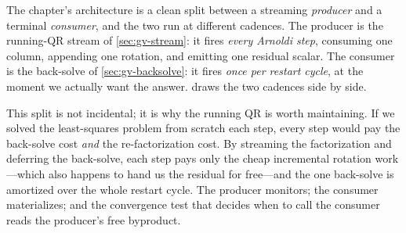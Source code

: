 The chapter's architecture is a clean split between a streaming \emph{producer} and a
terminal \emph{consumer}, and the two run at different cadences. The producer is the
running-QR stream of \cref{sec:gv-stream}: it fires \emph{every Arnoldi step}, consuming
one column, appending one rotation, and emitting one residual scalar. The consumer is the
back-solve of \cref{sec:gv-backsolve}: it fires \emph{once per restart cycle}, at the
moment we actually want the answer.  draws the two cadences
side by side.

This split is not incidental; it is why the running QR is worth maintaining. If we
solved the least-squares problem from scratch each step, every step would pay the
back-solve cost \emph{and} the re-factorization cost. By streaming the factorization and
deferring the back-solve, each step pays only the cheap incremental rotation
work---which also happens to hand us the residual for free---and the one back-solve is
amortized over the whole restart cycle. The producer monitors; the consumer materializes;
and the convergence test that decides when to call the consumer reads the producer's free
byproduct.

